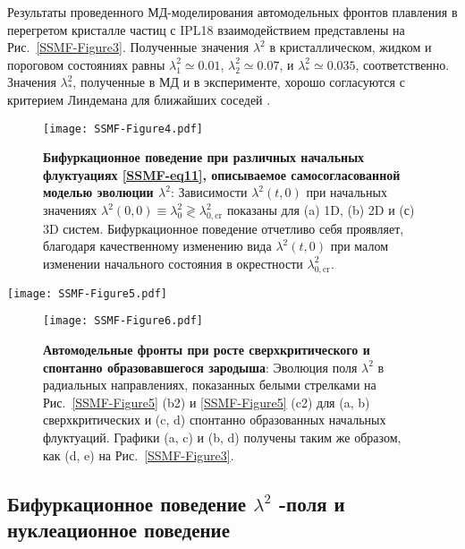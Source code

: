 Результаты проведенного МД-моделирования автомодельных фронтов плавления в перегретом кристалле частиц с IPL18 взаимодействием представлены на Рис.~\ref{SSMF-Figure3}.
Полученные значения $\lambda^2$ в кристаллическом, жидком и пороговом состояниях равны $\lambda_1^2 \simeq 0.01$, $\lambda_2^2 \simeq 0.07$, и $\lambda_\ast^2 \simeq 0.035$, соответственно.
Значения $\lambda_\ast^2$, полученные в МД и в эксперименте, хорошо согласуются с критерием Линдемана для ближайших соседей \cite{10.1016/0375-9601(85)90617-6}.


\begin{figure}[!t]
\centering
 \texttt{[image: SSMF-Figure4.pdf]}
 \caption{\textbf{Бифуркационное поведение при различных начальных флуктуациях \eqref {SSMF-eq11}, описываемое самосогласованной моделью эволюции $\lambda^2$}:
 Зависимости $\lambda^2(t, 0)$ при начальных значениях $ \lambda^2(0,0)\equiv\lambda_0 ^2\gtrless\lambda_{0,\mathrm {cr}}^2$ показаны для (a) 1D, (b) 2D и (с) 3D систем. Бифуркационное поведение отчетливо себя проявляет, благодаря качественному изменению вида $\lambda ^ 2(t,0)$ при малом изменении начального состояния в окрестности $\lambda_ {0,\mathrm{cr}}^2$.}
\label{SSMF-Figure4}
\end{figure}


\begin{figure*}[!t]
\centering
\texttt{[image: SSMF-Figure5.pdf]}
 \caption{\textbf{Эволюция различных начальных $\lambda^2$-флуктуаций и спонтанное зародышеобразование в однородной системе}:
 Последовательность снимков эволюции (a) докритической и (b) сверхкритической начальной флуктуации $\lambda^2$ и (c) спонтанного зарождения из-за теплового шума.}
\label{SSMF-Figure5}
\end{figure*}

\begin{figure}[!t]
\centering
\texttt{[image: SSMF-Figure6.pdf]}
 \caption{\textbf{Автомодельные фронты при росте сверхкритического и спонтанно образовавшегося зародыша}:
 Эволюция поля $ \lambda^2$ в радиальных направлениях, показанных белыми стрелками на Рис.~\ref{SSMF-Figure5} (b2) и \ref{SSMF-Figure5} (c2) для (a, b) сверхкритических и (c, d) спонтанно образованных начальных флуктуаций.
  Графики (a, c) и (b, d) получены таким же образом, как (d, e) на Рис.~\ref{SSMF-Figure3}.}
\label{SSMF-Figure6}
\end{figure}

\subsection{Бифуркационное поведение $\lambda^2$ -поля и нуклеационное поведение}
\label{SSMF-Results-Modeling}

